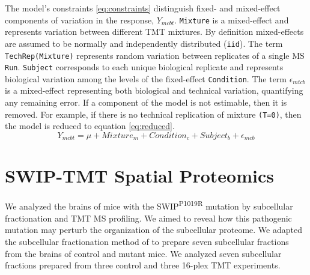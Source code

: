 \documentclass[11pt]{elife}\usepackage[]{graphicx}\usepackage[]{color}
\begin{document}
The model's constraints \ref{eq:constraints} distinguish fixed- and mixed-effect
components of variation in the response, $Y_{mcbt}$. \texttt{Mixture} is a
mixed-effect and represents variation between different TMT mixtures. By
definition mixed-effects are assumed to be normally and independently
distributed (\texttt{iid}).  The term \texttt{TechRep(Mixture)} represents
random variation between replicates of a single MS \texttt{Run}.
\texttt{Subject} corresponds to each unique biological replicate and represents
biological variation among the levels of the fixed-effect \texttt{Condition}.
The term $\epsilon_{mtcb}$ is a mixed-effect representing both biological and
technical variation, quantifying any remaining error. If a component of the
model is not estimable, then it is removed.  For example, if there is no
technical replication of mixture \texttt{(T=0)}, then the model is reduced to
equation \ref{eq:reduced}.
\begin{equation} %
	\label{eq:reduced} %
	Y_{mcbt} = \mu + Mixture_m + Condition_c + Subject_b + \epsilon_{mcb}
\end{equation}


\section{SWIP-TMT Spatial Proteomics}

We analyzed the brains of mice with the SWIP\textsuperscript{P1019R} mutation by
subcellular fractionation and TMT MS profiling.  We aimed to reveal how this
pathogenic mutation may perturb the organization of the subcellular proteome.
We adapted the subcellular fractionation method of \cite{Geladaki2019} to
prepare seven subcellular fractions from the brains of control and mutant mice.
We analyzed seven subcellular fractions prepared from three control and three
16-plex TMT experiments.
\end{document}
